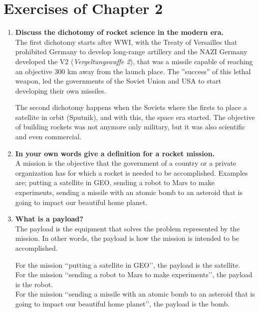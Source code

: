 \section{Exercises of Chapter 2}

\begin{enumerate}

	\item {\bf Discuss the dichotomy of rocket science in the modern era.}\\
	
The first dichotomy starts after WWI, with the Treaty of Versailles that prohibited Germany to develop long-range artillery and the NAZI Germany developed the V2 (\textit{Vergeltungswaffe 2}), that was a missile capable of reaching an objective 300 km away from the launch place. The ''success'' of this lethal weapon, led the governments of the Soviet Union and USA to start developing their own missiles.

The second dichotomy happens when the Soviets where the firsts to place a satellite in orbit (Sputnik), and with this, the space era started. The objective of building rockets was not anymore only military, but it was also scientific and even commercial. 

	\item {\bf In your own words give a definition for a rocket mission.}\\
	
A mission is the objective that the government of a country or a private organization has for which a rocket is needed to be accomplished. Examples are; putting a satellite in GEO, sending a robot to Mars to make experiments, sending a missile with an atomic bomb to an asteroid that is going to impact our beautiful home planet.
	
	\item {\bf What is a payload?}\\
	
The payload is the equipment that solves the problem represented by the mission. In other words, the payload is how the mission is intended to be accomplished.

For the mission \lq\lq{}putting a satellite in GEO\rq\rq{}, the payload is the satellite.\\
For the mission \lq\lq{}sending a robot to Mars to make experiments\rq\rq{}, the payload is the robot.\\
For the mission \lq\lq{}sending a missile with an atomic bomb to an asteroid that is going to impact our beautiful home planet\rq\rq{}, the payload is the bomb.


\end{enumerate}
